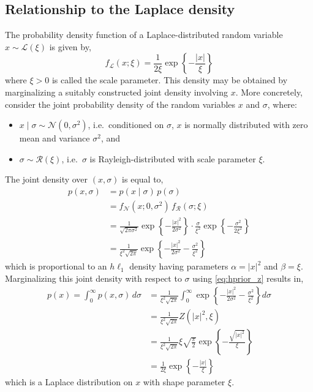 \documentclass{article}
\begin{document}
\subsection{Relationship to the Laplace density}
The probability density function of a Laplace-distributed random variable
$x \sim \mathcal{L}(\xi)$ is given by,
\begin{equation}
f_{\mathcal{L}}(x; \xi) =
 \frac{1}{2 \xi} \exp\left\{
  -\frac{|x|}{\xi}
 \right\}
\label{eq:laplace_pdf}
\end{equation}
where $\xi > 0$ is called the scale parameter. This density may be
obtained by marginalizing a suitably constructed joint density
involving $x$. More concretely, consider the joint probability
density of the random variables $x$ and $\sigma$, where:
\begin{itemize}
 \item $x \mid \sigma \sim \mathcal{N}(0, \sigma^2)$, i.e.\
  conditioned on $\sigma$, $x$ is normally distributed with
  zero mean and variance $\sigma^2$, and
 \item $\sigma \sim \mathcal{R}(\xi)$, i.e.\
  $\sigma$ is Rayleigh-distributed with scale parameter $\xi$.
\end{itemize}

The joint density over $(x,\sigma)$ is equal to,
\begin{equation}
\begin{aligned}
p(x, \sigma) &=
 p(x \mid \sigma) \, p(\sigma)
\\ &=
 f_{\mathcal{N}}(x; 0, \sigma^2) \,
 f_{\mathcal{R}}(\sigma; \xi)
\\ &=
 \frac{1}{\sqrt{2 \pi \sigma^2}} \exp\left\{
  -\frac{|x|^2}{2 \sigma^2}
 \right\} \cdot
 \frac{\sigma}{\xi^2} \exp\left\{
  -\frac{\sigma^2}{2 \xi^2}
 \right\}
\\ &=
 \frac{1}{\xi^2 \sqrt{2 \pi}} \exp\left\{
  -\frac{|x|^2}{2 \sigma^2}
  -\frac{\sigma^2}{\xi^2}
 \right\}
\end{aligned}
\label{eq:joint_pdf}
\end{equation}
which is proportional to an $h\ell_1$ density having parameters
$\alpha = |x|^2$ and $\beta = \xi$. Marginalizing this joint density
with respect to $\sigma$ using \eqref{eq:hprior_z} results in,
\begin{equation}
\begin{aligned}
p(x) =
\int_0^\infty p(x, \sigma) \, d\sigma &=
 \frac{1}{\xi^2 \sqrt{2 \pi}} \int_0^\infty \exp\left\{
  -\frac{|x|^2}{2 \sigma^2}
  -\frac{\sigma^2}{\xi^2}
 \right\} d\sigma
\\ &=
 \frac{1}{\xi^2 \sqrt{2 \pi}} Z(|x|^2, \xi)
\\ &=
 \frac{1}{\xi^2 \sqrt{2 \pi}}
 \xi \sqrt{\frac{\pi}{2}}
 \exp\left\{ -\frac{\sqrt{|x|^2}}{\xi} \right\}
\\ &=
 \frac{1}{2 \xi} \exp\left\{ -\frac{|x|}{\xi} \right\}
\end{aligned}
\label{eq:marginal_pdf}
\end{equation}
which is a Laplace distribution on $x$ with shape parameter $\xi$.

\end{document}
